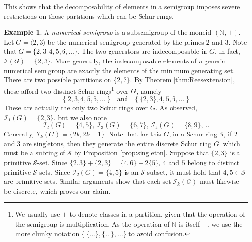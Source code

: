 \documentclass{article}
\theoremstyle{plain}
\theoremstyle{definition}
\newtheorem{Exam}[Thm]{Example}
\newcommand{\thmref}[1]{Theorem \ref{#1}}
\newcommand{\corref}[1]{Corollary \ref{#1}}
\newcommand{\propref}[1]{Proposition \ref{#1}}
\renewcommand{\S}{\mathcal{S}}
\newcommand{\N}{\mathbb{N}}
\newcommand{\I}{\mathscr{I}}
\begin{document}
This shows that the decomposability of elements in a semigroup imposes severe restrictions on those partitions which can be Schur rings.


\begin{Exam}\label{exam:numerical} A \emph{numerical semigroup} is a subsemigroup of the monoid $(\N,+)$. Let $G = \langle 2,3\rangle$ be the numerical semigroup generated by the primes $2$ and $3$. Note that $G = \{2,3,4,5,6,\ldots\}$. The two generators are indecomposable in $G$. In fact, $\I(G) = \{2,3\}$. More generally, the indecomposable elements of a generic numerical semigroup are exactly the elements of the minimum generating set. There are two possible partitions on $\{2,3\}$. By \thmref{thm:Reesextension}, these afford two distinct Schur rings\footnote{We usually use $+$ to denote classes in a partition, given that the operation of the semigroup is multiplication. As the operation of $\N$ is itself $+$, we use the more clunky notation $\{\ \{\ldots\}, \{\ldots\}, \ldots \}$ to avoid confusion.} over $G$, namely
\[\{\ 2, 3, 4, 5, 6, \ldots\ \} \quad\text{and}\quad
\{\ \{2,3\}, 4, 5, 6, \dots\ \}\] These are actually the only two Schur rings over $G$. As observed, $\I_1(G) = \{2,3\}$, but we also note 
\[\I_2(G) = \{4,5\},\ \I_3(G) = \{6, 7\},\ \I_4(G) = \{8,9\}, \ldots \]
Generally, $\I_k(G) = \{2k, 2k+1\}$. Note that for this $G$, in a Schur ring $\S$, if $2$ and $3$ are singletons, then they generate the entire discrete Schur ring $G$, which must be a subring of $\S$ by \propref{prop:singleton}. Suppose that $\{2,3\}$ is a primitive $\S$-set. Since 
$\{2,3\} + \{2,3\} = \{4,6\} + 2\{5\}$, $4$ and $5$ belong to distinct primitive $\S$-sets. Since $\I_2(G) = \{4,5\}$ is an $\S$-subset, it must hold that $4, 5\in \S$ are primitive sets. Similar arguments show that each set $\I_k(G)$ must likewise be discrete, which proves our claim. 
\end{Exam}
\end{document}
